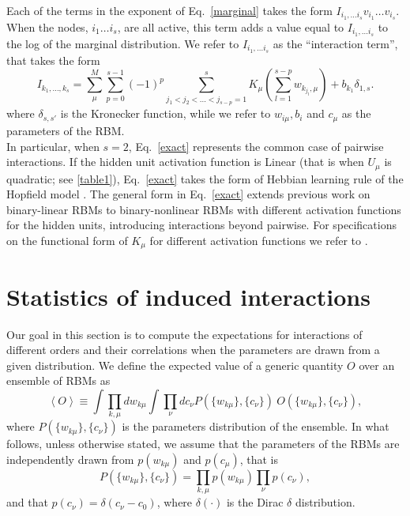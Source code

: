 \documentclass[11pt,letterpaper]{article}
\renewcommand{\red}[1]{#1}
\begin{document}
{\red Each of the terms in the exponent of Eq.~\eqref{marginal} takes the form $I_{i_1,\dots i_s} v_{i_1}\dots v_{i_s}$. When the nodes, $i_1 \dots i_s$, are all active, this term adds a value equal to $I_{i_1,\dots i_s}$ to the log of the marginal distribution.} We refer to $I_{i_1,\dots i_s}$ as the “interaction term”, that takes the form \cite{10.1162/neco_a_01420}
\begin{equation}
I_{k_{1},...,k_{s}}=\sum_{\mu}^{M}\sum_{p=0}^{s-1}(-1)^{p}\sum_{j_{1}<j_{2}<...<j_{s-p}=1}^{s}K_{\mu}\left(\sum_{l=1}^{s-p}w_{k_{j_{l}},\mu}\right) + b_{k_1} \delta_{1,s}.
\label{exact}
\end{equation}
where $\delta_{s,s'}$ is the Kronecker function, {\red while we refer to $w_{i\mu}, b_i$ and $c_{\mu}$ as the parameters of the RBM.}\\
In particular, when $s = 2$, Eq.~\eqref{exact} represents the common case of pairwise interactions. If the hidden unit activation function is Linear {\red (that is when $U_{\mu}$ is quadratic; see \ref{table1})}, Eq.~\eqref{exact} takes the form of Hebbian learning rule of the Hopfield model \cite{Barra:2012aa, 10.1162/neco_a_01420}.
The general form in Eq.~\eqref{exact} extends previous work on binary-linear RBMs \cite{Barra:2012aa} to binary-nonlinear RBMs with different activation functions for the hidden units, introducing interactions beyond pairwise. For specifications on the functional form of $K_{\mu}$ for different activation functions we refer to \cite{10.1162/neco_a_01420}.

\section{Statistics of induced interactions}
\label{sec3}
Our goal in this section is to compute the expectations for interactions of different orders and their correlations when the parameters are drawn from a given distribution. {\red We define} the expected value of a generic quantity $O$ over an ensemble of RBMs as
\begin{equation*}
    \left\langle O \right\rangle \equiv \int \prod_{k,\mu} d w_{k\mu} \int \prod_{\nu} d c_{\nu} P(\{w_{k\mu}\},\{c_{\nu}\})\ O(\{w_{k\mu}\},\{c_{\nu}\}),
\end{equation*}
where $P(\{w_{k\mu}\},\{c_{\nu}\} )$ is the parameters distribution of the ensemble. In what follows, unless otherwise stated, we assume that the parameters of the RBMs are independently drawn from $p(w_{k\mu})$ and $p(c_{\mu})$, that is
\begin{equation*}
P(\{w_{k\mu}\},\{c_{\nu}\})= \prod_{k,\mu} p(w_{k\mu}) \prod_{\nu} p(c_{\nu}),
\end{equation*}
and that $p(c_{\nu})= \delta(c_{\nu}-c_0)$, where $\delta(\cdot)$ is the Dirac $\delta$ distribution. 
\end{document}
